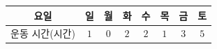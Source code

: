 {\renewcommand{\arraystretch}{1.35}\small
\begin{tabular}{|c|c|c|c|c|c|c|c|}
\hline
요일 & 일 & 월 & 화 & 수 & 목 & 금 & 토 \\ \hline
운동 시간(시간) & $1$ & $0$ & $2$ & $2$ & $1$ & $3$ & $5$ \\ \hline
\end{tabular}}
